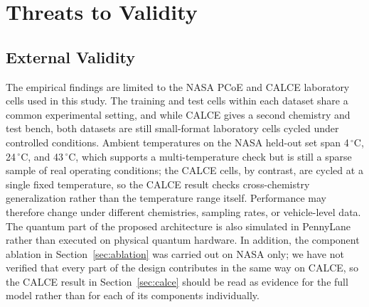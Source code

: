 \documentclass[a4paper,fleqn]{cas-sc}
\begin{document}


\section{Threats to Validity}\label{sec:threats}

\subsection{External Validity}\label{sec:external}
The empirical findings are limited to the NASA PCoE and CALCE laboratory cells used in this study. The training and test cells within each dataset share a common experimental setting, and while CALCE gives a second chemistry and test bench, both datasets are still small-format laboratory cells cycled under controlled conditions.
Ambient temperatures on the NASA held-out set span 4\,$^\circ$C, 24\,$^\circ$C, and 43\,$^\circ$C, which supports a multi-temperature check but is still a sparse sample of real operating conditions; the CALCE cells, by contrast, are cycled at a single fixed temperature, so the CALCE result checks cross-chemistry generalization rather than the temperature range itself. Performance may therefore change under different chemistries, sampling rates, or vehicle-level data. 
The quantum part of the proposed architecture is also simulated in PennyLane rather than executed on physical quantum hardware.
In addition, the component ablation in Section~\ref{sec:ablation} was carried out on NASA only; we have not verified that every part of the design contributes in the same way on CALCE, so the CALCE result in Section~\ref{sec:calce} should be read as evidence for the full model rather than for each of its components individually.
\end{document}
